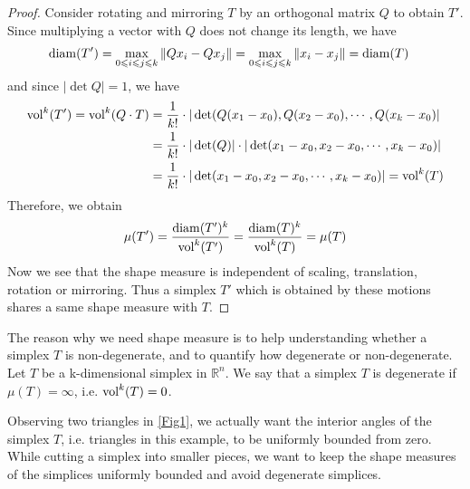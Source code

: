 \begin{proof}
    Consider rotating and mirroring $T$ by an orthogonal matrix $Q$ to obtain $T'$. Since multiplying a vector with $Q$ does not change its length, we have
    \begin{align*}
    \operatorname{diam}(T') &= \max_{0\leqslant i\leqslant j\leqslant k} \|Qx_i - Qx_j\|
               = \max_{0\leqslant i\leqslant j\leqslant k} \|x_i - x_j\| = \operatorname{diam}(T)
    \end{align*}
    and since $|\det Q| = 1$, we have
    \begin{align*}
    \operatorname{vol}^k(T') = \operatorname{vol}^k(Q\cdot T) &= \frac{1}{k!}\cdot |\det(Q(x_1-x_0), Q(x_2-x_0),\cdots, Q(x_k-x_0)|\\
                                &= \frac{1}{k!}\cdot|\det(Q)|\cdot|\det(x_1-x_0, x_2-x_0, \cdots, x_k-x_0)|\\
                                &= \frac{1}{k!}\cdot|\det(x_1-x_0, x_2-x_0, \cdots, x_k-x_0)| = \operatorname{vol}^k(T)
    \end{align*}
    Therefore, we obtain
    \begin{gather*}
    \mu(T') = \frac{\operatorname{diam}(T')^k}{\operatorname{vol}^k(T')} = \frac{\operatorname{diam}(T)^k}{\operatorname{vol}^k(T)} = \mu(T)
    \end{gather*}
    Now we see that the shape measure is independent of scaling, translation, rotation or mirroring. Thus a simplex $T'$ which is obtained by these motions shares a same shape measure with $T$.
    \end{proof}

    The reason why we need shape measure is to help understanding whether a simplex $T$ is non-degenerate, and to quantify how degenerate or non-degenerate. Let $T$ be a k-dimensional simplex in $\mathbb{R}^n$. We say that a simplex $T$ is degenerate if $\mu(T) = \infty$, i.e. $\operatorname{vol}^k(T) = 0$. 

    Observing two triangles in \ref{Fig1}, we actually want the interior angles of the simplex $T$, i.e. triangles in this example, to be uniformly bounded from zero.
    While cutting a simplex into smaller pieces, we want to keep the shape measures of the simplices uniformly bounded and avoid degenerate simplices.